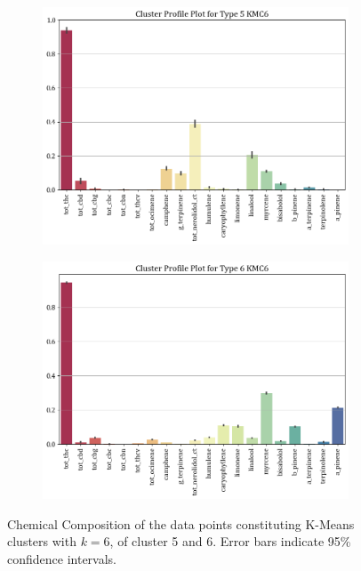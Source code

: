 \documentclass[11pt,a4paper]{article}
\begin{document}
\begin{figure}[H]
     \centering
     \begin{subfigure}[b]{0.475\textwidth}
         \centering
         \includegraphics[width=\textwidth]{images/km6_5.png}
         \label{fig:km6_5}
     \end{subfigure}
     \hfill
     \begin{subfigure}[b]{0.475\textwidth}
         \centering
         \includegraphics[width=\textwidth]{images/km6_6.png}
         \label{fig:km6_6}
     \end{subfigure}
    \caption{Chemical Composition of the data points constituting K-Means clusters with $k=6$, of cluster 5 and 6. Error bars indicate 95\% confidence intervals.}
    \label{fig:km6}
\end{figure}
\end{document}
